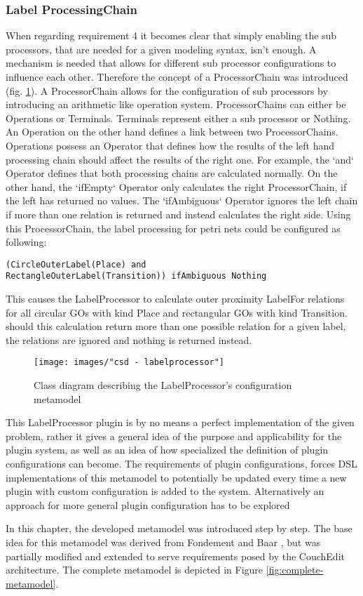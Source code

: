 \subsubsection{Label ProcessingChain}
When regarding requirement 4 it becomes clear that simply enabling the sub processors, that are needed for a given modeling syntax, isn't enough. A mechanism is needed that allows for different sub processor configurations to influence each other. Therefore the concept of a ProcessorChain was introduced (fig. \ref{fig:labelprocessor-config}). A ProcessorChain allows for the configuration of sub processors by introducing an arithmetic like operation system. ProcessorChains can either be Operations or Terminals. Terminals represent either a sub processor or Nothing. An Operation on the other hand defines a link between two ProcessorChains. Operations possess an Operator that defines how the results of the left hand processing chain should affect the results of the right one. For example, the `and` Operator defines that both processing chains are calculated normally. On the other hand, the `ifEmpty` Operator only calculates the right ProcessorChain, if the left has returned no values. The `ifAmbiguous` Operator ignores the left chain if more than one relation is returned and instead calculates the right side. Using this ProcessorChain, the label processing for petri nets could be configured as following: 
\begin{lstlisting}
(CircleOuterLabel(Place) and 
RectangleOuterLabel(Transition)) ifAmbiguous Nothing
\end{lstlisting}
This causes the LabelProcessor to calculate outer proximity LabelFor relations for all circular GOs with kind Place and rectangular GOs with kind Transition. should this calculation return more than one possible relation for a given label, the relations are ignored and nothing is returned instead.

\begin{figure}[ht]
\centering
\texttt{[image: images/"csd - labelprocessor"]}
\caption{Class diagram describing the LabelProcessor's configuration metamodel}
\label{fig:labelprocessor-config}
\end{figure}

This LabelProcessor plugin is by no means a perfect implementation of the given problem, rather it gives a general idea of the purpose and applicability for the plugin system, as well as an idea of how specialized the definition of plugin configurations can become. The requirements of plugin configurations, forces DSL implementations of this metamodel to potentially be updated every time a new plugin with custom configuration is added to the system. Alternatively an approach for more general plugin configuration has to be explored


In this chapter, the developed metamodel was introduced step by step. The base idea for this metamodel was derived from Fondement and Baar \cite{fondement_making_2005}, but was partially modified and extended to serve requirements posed by the CouchEdit architecture. The complete metamodel is depicted in Figure \ref{fig:complete-metamodel}. 
